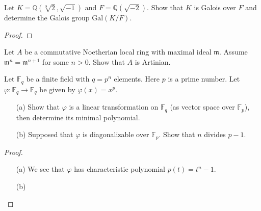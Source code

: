 \documentclass[openany]{book}
\begin{document}
\begin{prob}
    Let \(K = \mathbb{Q}(\sqrt[8]{2}, \sqrt{-1})\) and \(F = \mathbb{Q}(\sqrt{-2})\). Show that \(K\) is Galois over \(F\) and determine the Galois group \(\text{Gal}(K/F)\).
\end{prob}
\begin{proof}
    
\end{proof}



\begin{prob}
    Let \(A\) be a commutative Noetherian local ring with maximal ideal \(\mathfrak{m}\). Assume \(\mathfrak{m}^n = \mathfrak{m}^{n+1}\) for some \(n > 0\). Show that \(A\) is Artinian.
\end{prob}



\begin{prob}
    Let \(\mathbb{F}_q\) be a finite field with \(q = p^n\) elements. Here \(p\) is a prime number. Let \(\varphi : \mathbb{F}_q \rightarrow \mathbb{F}_q\) be given by \(\varphi(x) = x^p\).
    \begin{itemize}
        \item[(a)] Show that \(\varphi\) is a linear transformation on \(\mathbb{F}_q\) (as vector space over \(\mathbb{F}_p\)), then determine its minimal polynomial.
        \item[(b)] Supposed that \(\varphi\) is diagonalizable over \(\mathbb{F}_p\). Show that \(n\) divides \(p - 1\).
    \end{itemize}
\end{prob}
\begin{proof}
    \begin{enumerate}
        \item[(a)] We see that $\varphi$ has characteristic polynomial $p(t)=t^n-1$. 
        \item[(b)] 
    \end{enumerate}
\end{proof}
\end{document}
